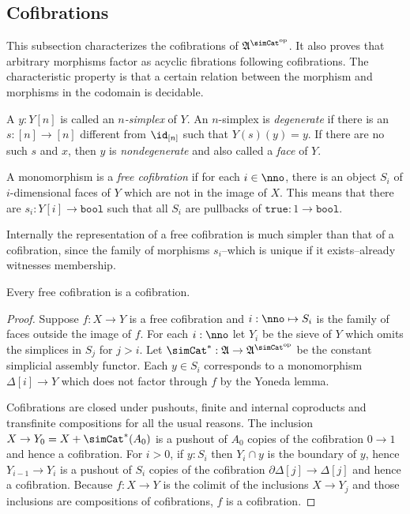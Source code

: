 \documentclass{tac}
\newcommand\ri{^*}
\newcommand\dual{^{\mathrm{op}}}
\newcommand\s{^{\simCat\dual}}
\newcommand\of{:}
\newcommand\simplex\Delta
\newcommand\cycle{\partial\Delta}
\newcommand\true{\mathtt{true}}
\newcommand\bool{\mathtt{bool}}
\newcommand\ambient{\mathfrak A}
\begin{document}
\subsection{Cofibrations}
This subsection characterizes the cofibrations of $\ambient\s$. It also proves that arbitrary morphisms factor as acyclic fibrations following cofibrations. The characteristic property is that a certain relation between the morphism and morphisms in the codomain is decidable.

\begin{definition} A $y\of Y[n]$ is called an \emph{$n$-simplex} of $Y$. An $n$-simplex is \emph{degenerate} if there is an $s\of [n]\to [n]$ different from $\id_{[n]}$ such that $Y(s)(y)=y$. If there are no such $s$ and $x$, then $y$ is \emph{nondegenerate} and also called a \emph{face} of $Y$.\end{definition}

\begin{definition} A monomorphism is a \emph{free cofibration} if for each $i\in \nno$, there is an object $S_i$ of $i$-dimensional faces of $Y$ which are not in the image of $X$. This means that there are $s_i:Y[i]\to\bool$ such that all $S_i$ are pullbacks of $\true:1\to\bool$.
\end{definition}

Internally the representation of a free cofibration is much simpler than that of a cofibration, since the family of morphisms $s_i$--which is unique if it exists--already witnesses membership.%

\begin{lemma} Every free cofibration is a cofibration. \label{Reedy}\end{lemma}

\begin{proof} Suppose $f\of X\to Y$ is a free cofibration and $i\of\nno\mapsto S_i$ is the family of faces outside the image of $f$. 
For each $i\of\nno$ let $Y_i$ be the sieve of $Y$ which omits the simplices in $S_j$ for $j>i$.
Let $\simCat\ri\of \ambient\to\ambient\s$ be the constant simplicial assembly functor. 
Each $y\in S_i$ corresponds to a monomorphism $\simplex[i]\to Y$ which does not factor through $f$ by the Yoneda lemma.

Cofibrations are closed under pushouts, finite and internal coproducts and transfinite compositions for all the usual reasons.
The inclusion $X\to Y_0 = X+\simCat\ri(A_0)$ is a pushout of $A_0$ copies of the cofibration $0\to 1$ and hence a cofibration.
For $i>0$, if $y\of S_i$ then $Y_i\cap y$ is the boundary of $y$, hence $Y_{i-1}\to Y_i$ is a pushout of $S_i$ copies of the cofibration $\cycle[j]\to\simplex[j]$ and hence a cofibration. Because $f\of X\to Y$ is the colimit of the inclusions $X\to Y_j$ and those inclusions are compositions of cofibrations, $f$ is a cofibration.
\end{proof}
\end{document}
